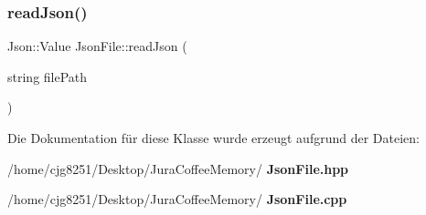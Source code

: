 \subsubsection{read\+Json()}
{\footnotesize\ttfamily Json\+::\+Value Json\+File\+::read\+Json (\begin{DoxyParamCaption}\item[{string}]{file\+Path }\end{DoxyParamCaption})}



Die Dokumentation für diese Klasse wurde erzeugt aufgrund der Dateien\+:\begin{DoxyCompactItemize}
\item 
/home/cjg8251/\+Desktop/\+Jura\+Coffee\+Memory/\textbf{ Json\+File.\+hpp}\item 
/home/cjg8251/\+Desktop/\+Jura\+Coffee\+Memory/\textbf{ Json\+File.\+cpp}\end{DoxyCompactItemize}
